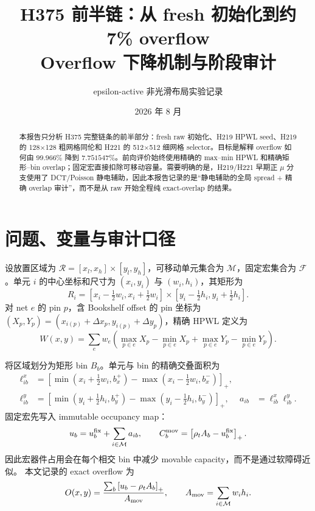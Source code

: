\documentclass[UTF8,11pt,a4paper]{ctexart}
\title{H375 前半链：从 fresh 初始化到约 7\% overflow\\
\large Overflow 下降机制与阶段审计}
\author{epsilon-active 非光滑布局实验记录}
\date{2026 年 8 月}
\newcommand{\mov}{\mathcal{M}}
\newcommand{\fix}{\mathcal{F}}
\newcommand{\R}{\mathcal{R}}
\newcommand{\clip}[1]{\left[#1\right]_+}
\begin{document}
\maketitle

\begin{abstract}
本报告只分析 H375 完整链条的前半部分：fresh raw 初始化、H219 HPWL seed、H219 的
128$\times$128 粗网格同伦和 H221 的 512$\times$512 细网格 selector。目标是解释
overflow 如何由 $99.966\%$ 降到 $7.751547\%$。前向评价始终使用精确的 max--min
HPWL 和精确矩形--bin overlap；固定宏直接扣除可移动容量。需要明确的是，H219/H221
早期正 $\mu$ 分支使用了 DCT/Poisson 静电辅助，因此本报告记录的是“静电辅助的全局
spread + 精确 overlap 审计”，而不是从 raw 开始全程纯 exact-overlap 的结果。
\end{abstract}

\section{问题、变量与审计口径}

设放置区域为 $\R=[x_l,x_h]\times[y_l,y_h]$，可移动单元集合为 $\mov$，固定宏集合为
$\fix$。单元 $i$ 的中心坐标和尺寸为 $(x_i,y_i)$ 与 $(w_i,h_i)$，其矩形为
\[
 R_i=[x_i-\tfrac12w_i,x_i+\tfrac12w_i]
     \times[y_i-\tfrac12h_i,y_i+\tfrac12h_i].
\]
对 net $e$ 的 pin $p$，含 Bookshelf offset 的 pin 坐标为
$(X_p,Y_p)=(x_{i(p)}+\Delta x_p,y_{i(p)}+\Delta y_p)$，精确 HPWL 定义为
\begin{equation}
 W(x,y)=\sum_{e}w_e\left(\max_{p\in e}X_p-\min_{p\in e}X_p
                         +\max_{p\in e}Y_p-\min_{p\in e}Y_p\right).
 \label{eq:hpwl}
\end{equation}

将区域划分为矩形 bin $B_b$。单元与 bin 的精确交叠面积为
\begin{align}
 \ell^x_{ib}&=\clip{\min(x_i+\tfrac12w_i,b_x^+)-\max(x_i-\tfrac12w_i,b_x^-)},\\
 \ell^y_{ib}&=\clip{\min(y_i+\tfrac12h_i,b_y^+)-\max(y_i-\tfrac12h_i,b_y^-)},
 &a_{ib}&=\ell^x_{ib}\ell^y_{ib}.
 \label{eq:overlap}
\end{align}
固定宏先写入 immutable occupancy map：
\begin{equation}
 u_b=u_b^{\rm fix}+\sum_{i\in\mov}a_{ib},\qquad
 C_b^{\rm mov}=\clip{\rho_t A_b-u_b^{\rm fix}}.
 \label{eq:capacity}
\end{equation}
因此宏器件占用会在每个相交 bin 中减少 movable capacity，而不是通过软障碍近似。
本文记录的 exact overflow 为
\begin{equation}
 O(x,y)=\frac{\sum_b\clip{u_b-\rho_t A_b}}{A_{\rm mov}},
 \qquad A_{\rm mov}=\sum_{i\in\mov}w_ih_i.
 \label{eq:overflow}
\end{equation}
\end{document}
